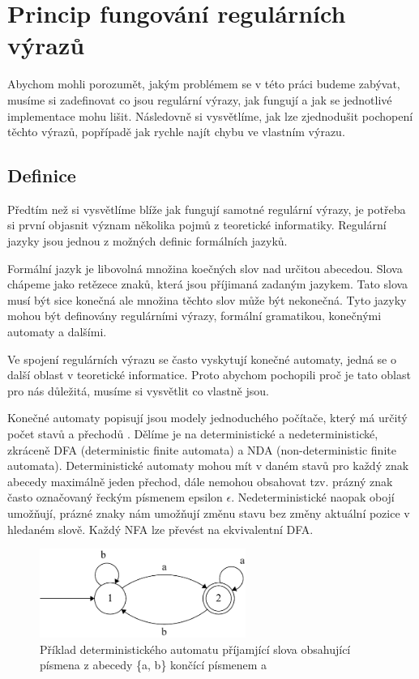 \chapter{Princip fungování regulárních výrazů}\label{sec:Principle}

Abychom mohli porozumět, jakým problémem se v této práci budeme zabývat, musíme si zadefinovat co jsou
regulární výrazy, jak fungují a jak se jednotlivé implementace mohu lišit. Následovně si vysvětlíme, jak lze zjednodušit
pochopení těchto výrazů, popřípadě jak rychle najít chybu ve vlastním výrazu. 

\section{Definice}
Předtím než si vysvětlíme blíže jak fungují samotné regulární výrazy, je potřeba si první objasnit význam několika pojmů z teoretické informatiky.
Regulární jazyky jsou jednou z možných definic formálních jazyků.

Formální jazyk je libovolná množina koečných slov nad určitou abecedou. Slova chápeme jako retězece znaků, která jsou příjimaná zadaným jazykem.
Tato slova musí být sice konečná ale množina těchto slov může být nekonečná. Tyto jazyky mohou být definovány regulárními výrazy, formální gramatikou, konečnými automaty a dalšími.

Ve spojení regulárních výrazu se často vyskytují konečné automaty, jedná se o další oblast v teoretické informatice.
Proto abychom pochopili proč je tato oblast pro nás důležitá, musíme si vysvětlit co vlastně jsou.

Konečné automaty popisují jsou modely jednoduchého počítače, který má určitý počet stavů a přechodů \cite{Havrlant}. 
Dělíme je na deterministické a nedeterministické, zkráceně DFA (deterministic finite automata) a NDA (non-deterministic finite automata).
Deterministické automaty mohou mít v daném stavů pro každý znak abecedy maximálně jeden přechod, dále nemohou obsahovat tzv. prázný znak často označovaný řeckým písmenem epsilon $\epsilon$.
Nedeterministické naopak obojí umožňují, prázné znaky nám umožňují změnu stavu bez změny aktuální pozice v hledaném slově. 
Každý NFA lze převést na ekvivalentní DFA.

\begin{figure}[!h]
	\centering
	\includegraphics[width=0.6\textwidth]{Figures/DFA_example.pdf}
	\caption{Příklad deterministického automatu příjamjící slova obsahující písmena z abecedy \{a, b\} končící písmenem a}
	\label{fig:DFAex}
\end{figure}

